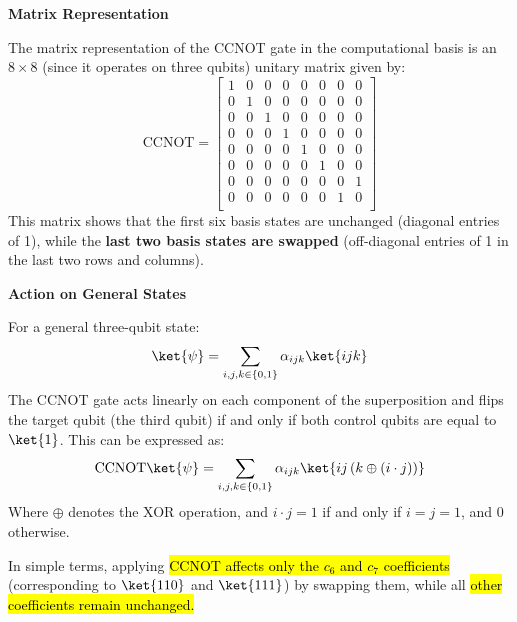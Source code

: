 \highspace
\begin{flushleft}
    \textcolor{Green3}{ \textbf{Matrix Representation}}
\end{flushleft}
The matrix representation of the CCNOT gate in the computational basis is an $8 \times 8$ (since it operates on three qubits) unitary matrix given by:
\begin{equation}
    \text{CCNOT} = \begin{bmatrix}
        1 & 0 & 0 & 0 & 0 & 0 & 0 & 0 \\
        0 & 1 & 0 & 0 & 0 & 0 & 0 & 0 \\
        0 & 0 & 1 & 0 & 0 & 0 & 0 & 0 \\
        0 & 0 & 0 & 1 & 0 & 0 & 0 & 0 \\
        0 & 0 & 0 & 0 & 1 & 0 & 0 & 0 \\
        0 & 0 & 0 & 0 & 0 & 1 & 0 & 0 \\
        0 & 0 & 0 & 0 & 0 & 0 & 0 & 1 \\
        0 & 0 & 0 & 0 & 0 & 0 & 1 & 0 \\
    \end{bmatrix}
\end{equation}
This matrix shows that the first six basis states are unchanged (diagonal entries of 1), while the \textbf{last two basis states are swapped} (off-diagonal entries of 1 in the last two rows and columns).

\highspace
\begin{flushleft}
    \textcolor{Green3}{ \textbf{Action on General States}}
\end{flushleft}
For a general three-qubit state:
\begin{equation*}
    \ket{\psi} = \sum_{i,j,k \in \{0,1\}} \alpha_{ijk} \ket{ijk}
\end{equation*}
The CCNOT gate acts linearly on each component of the superposition and flips the target qubit (the third qubit) if and only if both control qubits are equal to $\ket{1}$. This can be expressed as:
\begin{equation}\label{eq:ccnot-action-general}
    \text{CCNOT} \ket{\psi}
    =
    \sum_{i,j,k \in \{0,1\}} \alpha_{ijk} \ket{ij\left(k \oplus (i \cdot j)\right)}
\end{equation}
Where $\oplus$ denotes the XOR operation, and $i \cdot j = 1$ if and only if $i = j = 1$, and $0$ otherwise. 

\highspace
In simple terms, applying \hl{CCNOT affects only the $c_6$ and $c_7$ coefficients} (corresponding to $\ket{110}$ and $\ket{111}$) by swapping them, while all \hl{other coefficients remain unchanged.}

